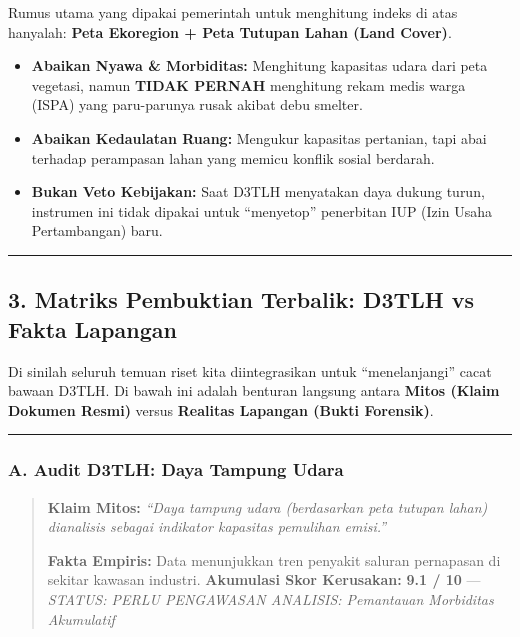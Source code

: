 \documentclass[
]{article}
\providecommand{\tightlist}{%
  \setlength{\itemsep}{0pt}\setlength{\parskip}{0pt}}
\begin{document}
Rumus utama yang dipakai pemerintah untuk menghitung indeks di atas
hanyalah: \textbf{Peta Ekoregion + Peta Tutupan Lahan (Land Cover)}.

\begin{itemize}
\tightlist
\item
  \textbf{Abaikan Nyawa \& Morbiditas:} Menghitung kapasitas udara dari
  peta vegetasi, namun \textbf{TIDAK PERNAH} menghitung rekam medis
  warga (ISPA) yang paru-parunya rusak akibat debu smelter.
\item
  \textbf{Abaikan Kedaulatan Ruang:} Mengukur kapasitas pertanian, tapi
  abai terhadap perampasan lahan yang memicu konflik sosial berdarah.
\item
  \textbf{Bukan Veto Kebijakan:} Saat D3TLH menyatakan daya dukung
  turun, instrumen ini tidak dipakai untuk ``menyetop'' penerbitan IUP
  (Izin Usaha Pertambangan) baru.
\end{itemize}

\begin{center}\rule{0.5\linewidth}{0.5pt}\end{center}

\subsection{3. Matriks Pembuktian Terbalik: D3TLH vs Fakta
Lapangan}\label{matriks-pembuktian-terbalik-d3tlh-vs-fakta-lapangan}

Di sinilah seluruh temuan riset kita diintegrasikan untuk
``menelanjangi'' cacat bawaan D3TLH. Di bawah ini adalah benturan
langsung antara \textbf{Mitos (Klaim Dokumen Resmi)} versus
\textbf{Realitas Lapangan (Bukti Forensik)}.

\begin{center}\rule{0.5\linewidth}{0.5pt}\end{center}

\subsubsection{A. Audit D3TLH: Daya Tampung
Udara}\label{a.-audit-d3tlh-daya-tampung-udara}

\begin{quote}
\textbf{Klaim Mitos:} \emph{``Daya tampung udara (berdasarkan peta
tutupan lahan) dianalisis sebagai indikator kapasitas pemulihan
emisi.''}

\textbf{Fakta Empiris:} Data menunjukkan tren penyakit saluran
pernapasan di sekitar kawasan industri. \textbf{Akumulasi Skor
Kerusakan:} \textbf{9.1 / 10} --- \emph{STATUS: PERLU PENGAWASAN
\textbar{} ANALISIS: Pemantauan Morbiditas Akumulatif}
\end{quote}
\end{document}
